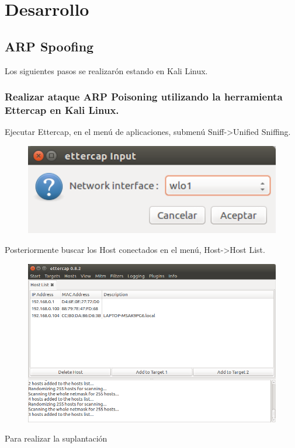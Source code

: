 \documentclass{article}
\begin{document}
\newpage
\section{Desarrollo}
\subsection{ARP Spoofing}
Los siguientes pasos se realizar\'on estando en Kali Linux.
\subsubsection{Realizar ataque ARP Poisoning utilizando la herramienta Ettercap en Kali Linux.}
Ejecutar Ettercap, en el men\'u de aplicaciones, submen\'u Sniff->Unified Sniffing.
\begin{figure}[H]
\centering
\includegraphics[width=1\textwidth]{01-UNIFIEDSNIFFING}
\end{figure}

Posteriormente buscar los Host conectados en el men\'u, Host->Host List.
\begin{figure}[H]
\centering
\includegraphics[width=1\textwidth]{02-HOSTLIST}
\end{figure}

Para realizar la suplantaci\'on 
\end{document}
